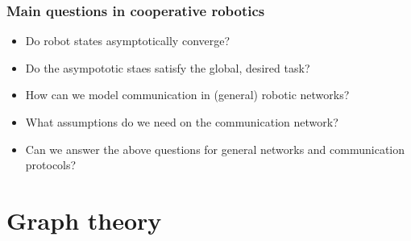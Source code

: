 \documentclass{book}
\theoremstyle{definition}
\theoremstyle{remark}
\theoremstyle{remark}
\begin{document}
\subsection{Main questions in cooperative robotics}
\begin{itemize}
    \item Do robot states asymptotically converge? 
    \item Do the asympototic staes satisfy the global, desired task?
    \item How can we model communication in (general) robotic networks?
    \item What assumptions do we need on the communication network?
    \item Can we answer the above questions for general networks and communication protocols?
\end{itemize}










\chapter{Graph theory}
\end{document}
